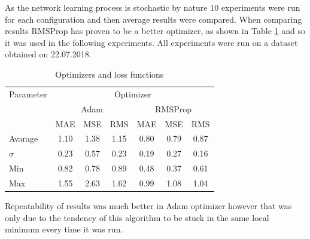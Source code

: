 \documentclass{article}
\begin{document}
As the network learning process is stochastic by nature 10 experiments were run for each
configuration and then average results were compared.
When comparing results RMSProp has proven to be a better optimizer, as shown in Table 
\ref{tab:optimizers} and so it was used in the following experiments.
All experiments were run on a dataset obtained on 22.07.2018.
\begin{table}[htb] 
	\centering
	\caption{Optimizers and loss functions}
	\label{tab:optimizers}
	\begin{tabular}{l*{6}{c}}
		\hline
		\hline
		Parameter& \multicolumn{6}{c}{Optimizer}  \\
		&\multicolumn{3}{c}{Adam}&\multicolumn{3}{c}{RMSProp}\\
		\hline
		& MAE & MSE & RMS & MAE & MSE & RMS  \\
		Avarage & 1.10 & 1.38 & 1.15 & 0.80 & 0.79 & 0.87  \\
		$\sigma$ & 0.23 & 0.57 & 0.23 & 0.19 & 0.27 & 0.16  \\
		Min & 0.82 & 0.78 & 0.89 & 0.48 & 0.37 & 0.61  \\
		Max & 1.55 & 2.63 & 1.62 & 0.99 & 1.08 & 1.04  \\
		\hline
		\hline
	\end{tabular}
\end{table}
Repeatability of results was much better in Adam optimizer however that was only due 
to the tendency of this algorithm to be stuck in the same local minimum every time it was run.
\end{document}
